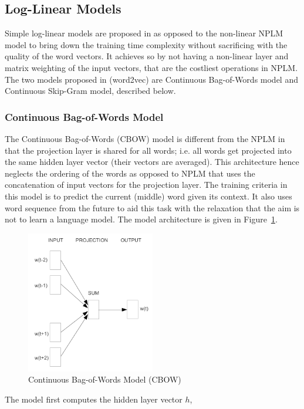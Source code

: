 \subsection{Log-Linear Models}
\label{sec:word2vec}
Simple log-linear models are proposed in \cite{mikolov2013efficient} as opposed to the non-linear NPLM model to bring down the training time complexity without sacrificing with the quality of the word vectors. It achieves so by not having a non-linear layer and matrix weighting of the input vectors, that are the costliest operations in NPLM. The two models proposed in \cite{mikolov2013efficient} (word2vec) are Continuous Bag-of-Words model and Continuous Skip-Gram model, described below.

\subsubsection{Continuous Bag-of-Words Model}
\label{sec:cbow}
The Continuous Bag-of-Words (CBOW) model is different from the NPLM in that the projection layer is shared for all words; i.e. all words get projected into the same hidden layer vector (their vectors are averaged). This architecture hence neglects the ordering of the words as opposed to NPLM that uses the concatenation of input vectors for the projection layer. The training criteria in this model is to predict the current (middle) word given its context. It also uses word sequence from the future to aid this task with the relaxation that the aim is not to learn a language model. The model architecture is given in Figure~\ref{fig:nn:cbow}.
\begin{figure}[h!]
    \centering
        \includegraphics[width=0.5\textwidth]{figs/mikolov_cbow.png}
    \caption{Continuous Bag-of-Words Model (CBOW)}
    \label{fig:nn:cbow}
\end{figure}
The model first computes the hidden layer vector $h$, 
